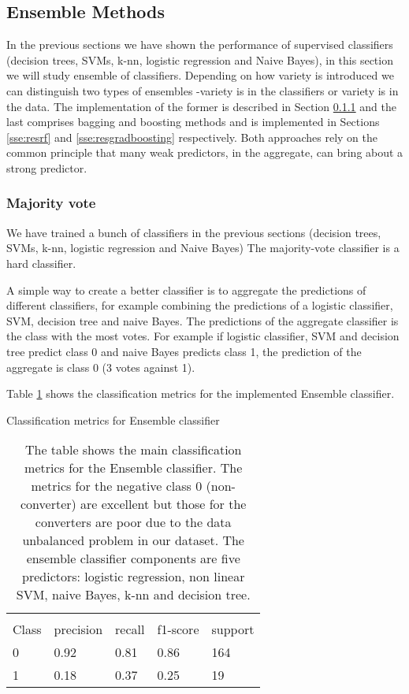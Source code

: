\documentclass[11pt]{article}
\theoremstyle{definition}
\theoremstyle{remark}
\begin{document}
\subsection{Ensemble Methods}
\label{sse:resensemble}
In the previous sections we have shown the performance of supervised classifiers (decision trees, SVMs, k-nn, logistic regression and Naive Bayes), in this section we will study ensemble of classifiers. Depending on how variety is introduced we can distinguish two types of ensembles -variety is in the classifiers or variety is in the data. The implementation of the former is described in Section \ref{sse:resmajvot} and the last comprises bagging and boosting methods and is implemented in Sections \ref{sse:resrf} and \ref{sse:resgradboosting} respectively. Both approaches rely on the common principle that many weak predictors, in the aggregate, can bring about a strong predictor.

\subsubsection{Majority vote}
\label{sse:resmajvot}

We have trained a bunch of classifiers in the previous sections (decision trees, SVMs, k-nn, logistic regression and Naive Bayes) The majority-vote classifier is a hard classifier. 

A simple way to create a better classifier is to aggregate the predictions of different classifiers, for example combining the predictions of a logistic classifier, SVM, decision tree and naive Bayes. The predictions of the aggregate classifier is the class with the most votes. For example if logistic classifier, SVM and decision tree predict class 0 and naive Bayes predicts class 1, the prediction of the aggregate is class 0 (3 votes against 1).

Table \ref{tab:ensemble} shows the classification metrics for the implemented Ensemble classifier.
\begin{table}[H]
\caption{Classification metrics for Ensemble classifier}
\begin{center} 
\begin{tabular}{lllll}
\hline
\multicolumn{1}{c}{} \\
Class & precision & recall & f1-score & support     \\
\hline
0 & 0.92  &    0.81  &   0.86   &    164 \\
1 & 0.18  &    0.37   &   0.25   &    19 \\
\hline
\end{tabular}
\caption{The table shows the main classification metrics for the Ensemble classifier. The metrics for the negative class 0 (non-converter) are excellent but those for the converters are poor due to the data unbalanced problem in our dataset.
The ensemble classifier components are five predictors: logistic regression, non linear SVM, naive Bayes, k-nn and decision tree.
}  \label{tab:ensemble} 
\end{center}
\end{table}
\end{document}

